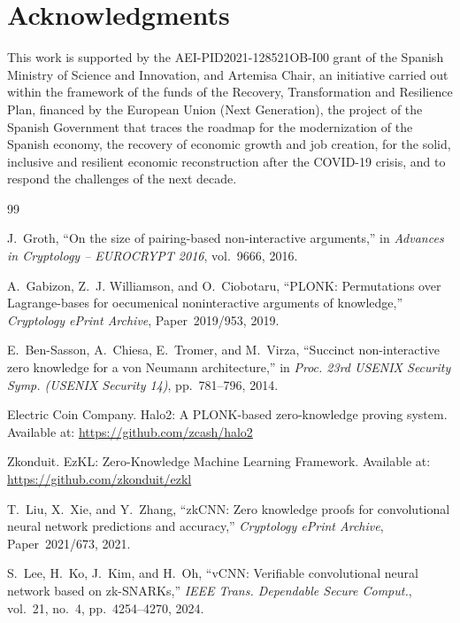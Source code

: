 \documentclass[10pt,conference,a4paper]{IEEEtran}
\begin{document}
\section*{Acknowledgments}

This work is supported by the AEI-PID2021-128521OB-I00 grant of the Spanish Ministry of Science and Innovation, and Artemisa Chair, an initiative carried out within the framework of the funds of the Recovery, Transformation and Resilience Plan, financed by the European Union (Next Generation), the project of the Spanish Government that traces the roadmap for the modernization of the Spanish economy, the recovery of economic growth and job creation, for the solid, inclusive and resilient economic reconstruction after the COVID-19 crisis, and to respond the challenges of the next decade.

\begin{thebibliography}{99}

J.~Groth, ``On the size of pairing-based non-interactive arguments,'' in \emph{Advances in Cryptology -- EUROCRYPT 2016}, vol.~9666, 2016.

A.~Gabizon, Z.~J. Williamson, and O.~Ciobotaru, ``PLONK: Permutations over Lagrange-bases for oecumenical noninteractive arguments of knowledge,'' \emph{Cryptology ePrint Archive}, Paper~2019/953, 2019.

E.~Ben-Sasson, A.~Chiesa, E.~Tromer, and M.~Virza, ``Succinct non-interactive zero knowledge for a von Neumann architecture,'' in \emph{Proc. 23rd USENIX Security Symp. (USENIX Security 14)}, pp.~781--796, 2014.

Electric Coin Company.
\newblock Halo2: A PLONK-based zero-knowledge proving system.
\newblock Available at: \url{https://github.com/zcash/halo2}

Zkonduit.
\newblock EzKL: Zero-Knowledge Machine Learning Framework.
\newblock Available at: \url{https://github.com/zkonduit/ezkl}

T.~Liu, X.~Xie, and Y.~Zhang, ``zkCNN: Zero knowledge proofs for convolutional neural network predictions and accuracy,'' \emph{Cryptology ePrint Archive}, Paper~2021/673, 2021.

S.~Lee, H.~Ko, J.~Kim, and H.~Oh, ``vCNN: Verifiable convolutional neural network based on zk-SNARKs,'' \emph{IEEE Trans. Dependable Secure Comput.}, vol.~21, no.~4, pp.~4254--4270, 2024.


\end{thebibliography}
\end{document}
